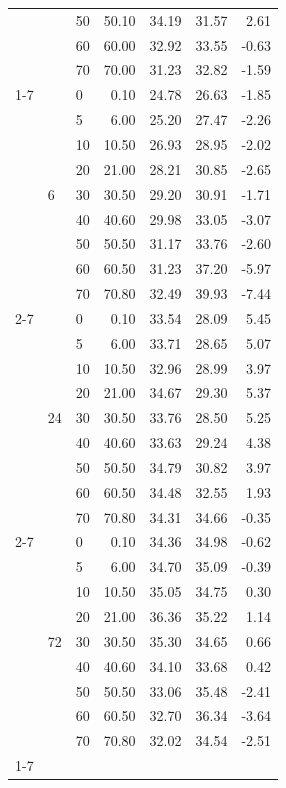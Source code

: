 \begin{table}
\begin{tabular}{lllrrrr}
 &  & 50 & 50.10 & 34.19 & 31.57 & 2.61 \\
 &  & 60 & 60.00 & 32.92 & 33.55 & -0.63 \\
 &  & 70 & 70.00 & 31.23 & 32.82 & -1.59 \\
\cline{1-7} \cline{2-7}
\multirow[t]{27}{*}{out} & \multirow[t]{9}{*}{6} & 0 & 0.10 & 24.78 & 26.63 & -1.85 \\
 &  & 5 & 6.00 & 25.20 & 27.47 & -2.26 \\
 &  & 10 & 10.50 & 26.93 & 28.95 & -2.02 \\
 &  & 20 & 21.00 & 28.21 & 30.85 & -2.65 \\
 &  & 30 & 30.50 & 29.20 & 30.91 & -1.71 \\
 &  & 40 & 40.60 & 29.98 & 33.05 & -3.07 \\
 &  & 50 & 50.50 & 31.17 & 33.76 & -2.60 \\
 &  & 60 & 60.50 & 31.23 & 37.20 & -5.97 \\
 &  & 70 & 70.80 & 32.49 & 39.93 & -7.44 \\
\cline{2-7}
 & \multirow[t]{9}{*}{24} & 0 & 0.10 & 33.54 & 28.09 & 5.45 \\
 &  & 5 & 6.00 & 33.71 & 28.65 & 5.07 \\
 &  & 10 & 10.50 & 32.96 & 28.99 & 3.97 \\
 &  & 20 & 21.00 & 34.67 & 29.30 & 5.37 \\
 &  & 30 & 30.50 & 33.76 & 28.50 & 5.25 \\
 &  & 40 & 40.60 & 33.63 & 29.24 & 4.38 \\
 &  & 50 & 50.50 & 34.79 & 30.82 & 3.97 \\
 &  & 60 & 60.50 & 34.48 & 32.55 & 1.93 \\
 &  & 70 & 70.80 & 34.31 & 34.66 & -0.35 \\
\cline{2-7}
 & \multirow[t]{9}{*}{72} & 0 & 0.10 & 34.36 & 34.98 & -0.62 \\
 &  & 5 & 6.00 & 34.70 & 35.09 & -0.39 \\
 &  & 10 & 10.50 & 35.05 & 34.75 & 0.30 \\
 &  & 20 & 21.00 & 36.36 & 35.22 & 1.14 \\
 &  & 30 & 30.50 & 35.30 & 34.65 & 0.66 \\
 &  & 40 & 40.60 & 34.10 & 33.68 & 0.42 \\
 &  & 50 & 50.50 & 33.06 & 35.48 & -2.41 \\
 &  & 60 & 60.50 & 32.70 & 36.34 & -3.64 \\
 &  & 70 & 70.80 & 32.02 & 34.54 & -2.51 \\
\cline{1-7} \cline{2-7}
\bottomrule
\end{tabular}
\end{table}
